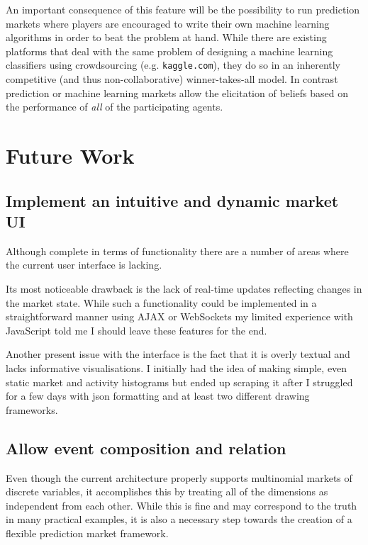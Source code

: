 \documentclass[bsc,frontabs,twoside,singlespacing,parskip,deptreport]{infthesis}     %
\begin{document}
	An important consequence of this feature will be the possibility to run prediction markets where players are encouraged to write their own machine learning algorithms in order to beat the problem at hand. While there are existing platforms that deal with the same problem of designing a machine learning classifiers using crowdsourcing (e.g. {\tt kaggle.com}), they do so in an inherently competitive (and thus non-collaborative) winner-takes-all model. In contrast prediction or machine learning markets allow the elicitation of beliefs based on the performance of {\em all} of the participating agents. 

\section{Future Work}

\subsection{Implement an intuitive and dynamic market UI}
	Although complete in terms of functionality there are a number of areas where the current user interface is lacking. 
	
	Its most noticeable drawback is the lack of real-time updates reflecting changes in the market state. While such a functionality could be implemented in a straightforward manner using AJAX or WebSockets my limited experience with JavaScript told me I should leave these features for the end.  
	
	Another present issue with the interface is the fact that it is overly textual and lacks informative visualisations. I initially had the idea of making simple, even static market and activity histograms but ended up scraping it after I struggled for a few days with json formatting and at least two different drawing frameworks. 

\subsection{Allow event composition and relation}

    Even though the current architecture properly supports multinomial markets of discrete variables, it accomplishes this by treating all of the dimensions as independent from each other. While this is fine and may correspond to the truth in many practical examples, it is also a necessary step towards the creation of a flexible prediction market framework. 
    
\end{document}
